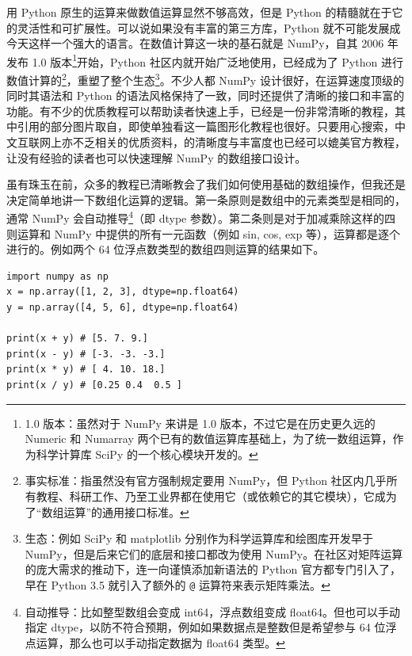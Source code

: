 用 Python 原生的运算来做数值运算显然不够高效，但是 Python 的精髓就在于它的灵活性和可扩展性。可以说如果没有丰富的第三方库，Python 就不可能发展成今天这样一个强大的语言。在数值计算这一块的基石就是 NumPy，自其 2006 年发布 1.0 版本\footnote{1.0 版本：虽然对于 NumPy 来讲是 1.0 版本，不过它是在历史更久远的 Numeric 和 Numarray 两个已有的数值运算库基础上，为了统一数组运算，作为科学计算库 SciPy 的一个核心模块开发的。}开始，Python 社区内就开始广泛地使用，已经成为了 Python 进行数值计算的\footnote{事实标准：指虽然没有官方强制规定要用 NumPy，但 Python 社区内几乎所有教程、科研工作、乃至工业界都在使用它（或依赖它的其它模块），它成为了“数组运算”的通用接口标准。}，重塑了整个生态\footnote{生态：例如 SciPy 和 matplotlib 分别作为科学运算库和绘图库开发早于 NumPy，但是后来它们的底层和接口都改为使用 NumPy。在社区对矩阵运算的庞大需求的推动下，连一向谨慎添加新语法的 Python 官方都专门引入了，早在 Python 3.5 就引入了额外的 \texttt{@} 运算符来表示矩阵乘法。}。不少人都 NumPy 设计很好，在运算速度顶级的同时其语法和 Python 的语法风格保持了一致，同时还提供了清晰的接口和丰富的功能。有不少的优质教程可以帮助读者快速上手，已经是一份非常清晰的教程，其中引用的部分图片取自，即使单独看这一篇图形化教程也很好。只要用心搜索，中文互联网上亦不乏相关的优质资料，的清晰度与丰富度也已经可以媲美官方教程，让没有经验的读者也可以快速理解 NumPy 的数组接口设计。

虽有珠玉在前，众多的教程已清晰教会了我们如何使用基础的数组操作，但我还是决定简单地讲一下数组化运算的逻辑。第一条原则是数组中的元素类型是相同的，通常 NumPy 会自动推导\footnote{自动推导：比如整型数组会变成 int64，浮点数组变成 float64。但也可以手动指定 dtype，以防不符合预期，例如如果数据点是整数但是希望参与 64 位浮点运算，那么也可以手动指定数据为 float64 类型。}（即 dtype 参数）。第二条则是对于加减乘除这样的四则运算和 NumPy 中提供的所有一元函数（例如 sin, cos, exp 等），运算都是逐个进行的。例如两个 64 位浮点数类型的数组四则运算的结果如下。
\begin{verbatim}
import numpy as np
x = np.array([1, 2, 3], dtype=np.float64)
y = np.array([4, 5, 6], dtype=np.float64)

print(x + y) # [5. 7. 9.]
print(x - y) # [-3. -3. -3.]
print(x * y) # [ 4. 10. 18.]
print(x / y) # [0.25 0.4  0.5 ]
\end{verbatim}


